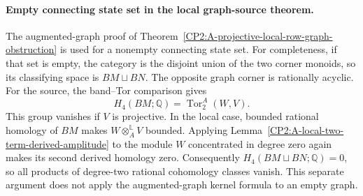 \paragraph{Empty connecting state set in the local graph-source theorem.}
The augmented-graph proof of
Theorem~\ref{CP2:A-projective-local-row-graph-obstruction} is used for a
nonempty connecting state set.  For completeness, if that set is empty,
the category is the disjoint union of the two corner monoids, so its
classifying space is $BM\sqcup BN$.  The opposite graph corner is
rationally acyclic.  For the source, the band--Tor comparison gives
\[
 H_4(BM;\mathbb Q)=\operatorname{Tor}^{A}_2(W,V).
\]
This group vanishes if $V$ is projective.  In the local case, bounded
rational homology of $BM$ makes $W\otimes_A^{\mathbb L}V$ bounded.
Applying Lemma~\ref{CP2:A-local-two-term-derived-amplitude} to the module
$W$ concentrated in degree zero again makes its second derived homology
zero.  Consequently $H_4(BM\sqcup BN;\mathbb Q)=0$, so all products of
degree-two rational cohomology classes vanish.  This separate argument
does not apply the augmented-graph kernel formula to an empty graph.
